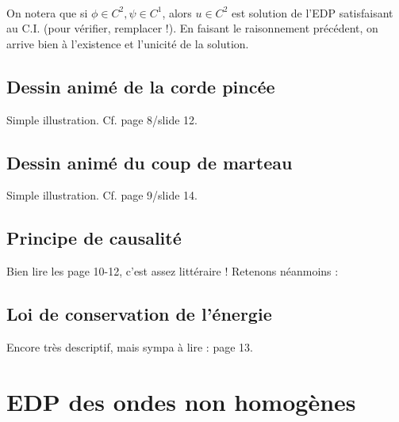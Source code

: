 \documentclass[11pt, a4paper, openany]{book}
\begin{document}
			\ \\
			On notera que si $\phi \in C^2, \psi \in C^1$, alors $u\in C^2$ est solution de l'EDP satisfaisant au C.I. (pour vérifier, remplacer !). En faisant le raisonnement précédent, on arrive bien à l'existence et l'unicité de la solution.
																
			\subsection{Dessin animé de la corde pincée}
			Simple illustration. Cf. page 8/slide 12.
																
			\subsection{Dessin animé du coup de marteau}
			Simple illustration. Cf. page 9/slide 14.
																
			\subsection{Principe de causalité}
			Bien lire les page 10-12, c'est assez littéraire ! Retenons néanmoins :\\
																
																
			\subsection{Loi de conservation de l'énergie}
			Encore très descriptif, mais sympa à lire : page 13.
																
																
			\section{EDP des ondes non homogènes}
\end{document}

